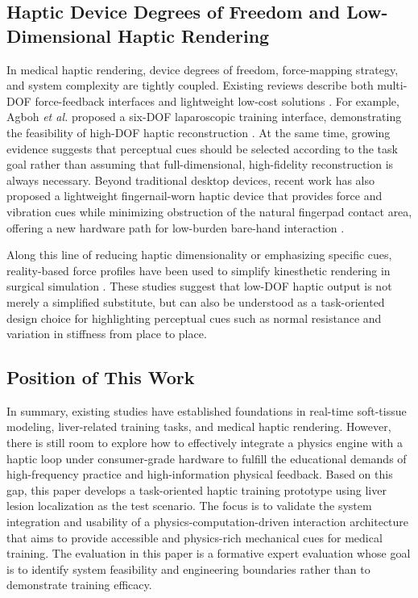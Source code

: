 \documentclass{ieeeaccess}
\begin{document}
\subsection{Haptic Device Degrees of Freedom and Low-Dimensional Haptic Rendering}
In medical haptic rendering, device degrees of freedom, force-mapping strategy, and system complexity are tightly coupled. Existing reviews describe both multi-DOF force-feedback interfaces and lightweight low-cost solutions \cite{overtoom2019haptic,rangarajan2020systematic,escobar2016review}. For example, Agboh \emph{et al.} proposed a six-DOF laparoscopic training interface, demonstrating the feasibility of high-DOF haptic reconstruction \cite{agboh2016six}. At the same time, growing evidence suggests that perceptual cues should be selected according to the task goal rather than assuming that full-dimensional, high-fidelity reconstruction is always necessary. Beyond traditional desktop devices, recent work has also proposed a lightweight fingernail-worn haptic device that provides force and vibration cues while minimizing obstruction of the natural fingerpad contact area, offering a new hardware path for low-burden bare-hand interaction \cite{xu2025lightweight}.

Along this line of reducing haptic dimensionality or emphasizing specific cues, reality-based force profiles have been used to simplify kinesthetic rendering in surgical simulation \cite{bjelland2025haptic}. These studies suggest that low-DOF haptic output is not merely a simplified substitute, but can also be understood as a task-oriented design choice for highlighting perceptual cues such as normal resistance and variation in stiffness from place to place.

\subsection{Position of This Work}
In summary, existing studies have established foundations in real-time soft-tissue modeling, liver-related training tasks, and medical haptic rendering. However, there is still room to explore how to effectively integrate a physics engine with a haptic loop under consumer-grade hardware to fulfill the educational demands of high-frequency practice and high-information physical feedback. Based on this gap, this paper develops a task-oriented haptic training prototype using liver lesion localization as the test scenario. The focus is to validate the system integration and usability of a physics-computation-driven interaction architecture that aims to provide accessible and physics-rich mechanical cues for medical training. The evaluation in this paper is a formative expert evaluation whose goal is to identify system feasibility and engineering boundaries rather than to demonstrate training efficacy.
\end{document}
